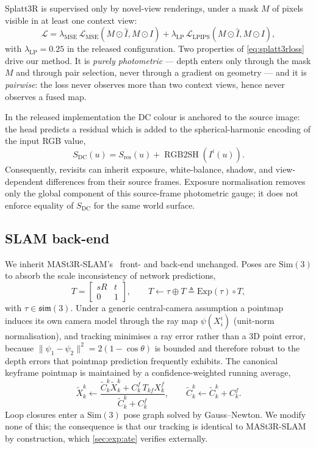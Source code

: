Splatt3R is supervised only by novel-view renderings, under a mask $M$ of
pixels visible in at least one context view:
\begin{equation}
\mathcal{L} = \lambda_{\text{MSE}}\,\mathcal{L}_{\text{MSE}}(M\!\odot\!\hat{I}, M\!\odot\!I)
            + \lambda_{\text{LP}}\,\mathcal{L}_{\text{LPIPS}}(M\!\odot\!\hat{I}, M\!\odot\!I),
\label{eq:splatt3rloss}
\end{equation}
with $\lambda_{\text{LP}}{=}0.25$ in the released configuration. Two properties
of \cref{eq:splatt3rloss} drive our method. It is \emph{purely photometric} ---
depth enters only through the mask $M$ and through pair selection, never
through a gradient on geometry --- and it is \emph{pairwise}: the loss never
observes more than two context views, hence never observes a fused map.

In the released implementation the DC colour is anchored to the source image:
the head predicts a residual which is added to the spherical-harmonic encoding
of the input RGB value,
\begin{equation}
S_{\mathrm{DC}}(u)=S_{\mathrm{res}}(u)+\operatorname{RGB2SH}(I^i(u)).
\label{eq:colorresidual}
\end{equation}
Consequently, revisits can inherit exposure, white-balance, shadow, and
view-dependent differences from their source frames. Exposure normalisation
removes only the global component of this source-frame photometric gauge; it
does not enforce equality of $S_{\mathrm{DC}}$ for the same world surface.

\subsection{SLAM back-end}
We inherit MASt3R-SLAM's~\cite{murai2025mast3rslam} front- and back-end
unchanged. Poses are $\mathrm{Sim}(3)$ to absorb the scale inconsistency of
network predictions,
\begin{equation}
T=\begin{bmatrix} sR & t\\ 0 & 1\end{bmatrix},\qquad
T \leftarrow \tau \oplus T \triangleq \mathrm{Exp}(\tau)\circ T ,
\label{eq:sim3}
\end{equation}
with $\tau\in\mathfrak{sim}(3)$. Under a generic central-camera assumption a
pointmap induces its own camera model through the ray map
$\psi(X^i_i)$ (unit-norm normalisation), and tracking minimises a ray error
rather than a 3D point error, because
$\lVert\psi_1-\psi_2\rVert^2 = 2(1-\cos\theta)$ is bounded and therefore
robust to the depth errors that pointmap prediction frequently exhibits. The
canonical keyframe pointmap is maintained by a confidence-weighted running
average,
\begin{equation}
\tilde X^k_k \leftarrow
\frac{\tilde C^k_k \tilde X^k_k + C^f_k\, T_{kf} X^f_k}{\tilde C^k_k + C^f_k},
\qquad
\tilde C^k_k \leftarrow \tilde C^k_k + C^f_k .
\label{eq:fusion}
\end{equation}
Loop closures enter a $\mathrm{Sim}(3)$ pose graph solved by Gauss--Newton.
We modify none of this; the consequence is that our tracking is identical to
MASt3R-SLAM by construction, which \cref{sec:exp:ate} verifies externally.

